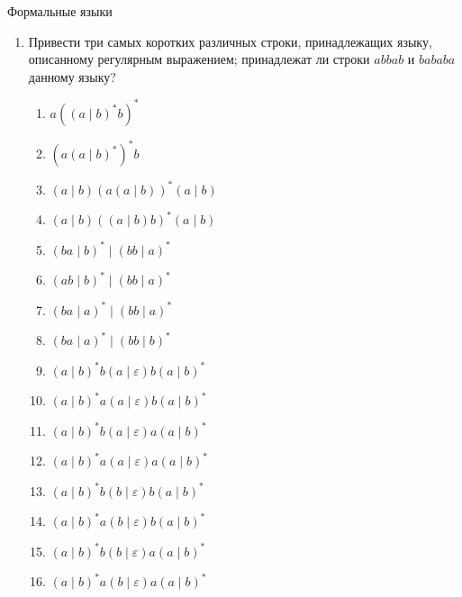\documentclass[12pt]{article}
\begin{document}
\begin{center}
{\LARGE Формальные языки}
\end{center}

\bigskip

\begin{enumerate}
\setlength\itemsep{1em}

  \item Привести три самых коротких различных строки, принадлежащих языку, описанному регулярным выражением; принадлежат ли строки $abbab$ и $bababa$ данному языку?
  \begin{enumerate}[label=\arabic*)]
    \setlength\itemsep{0.8em}
    \item $a ((a \mid b)^* b)^* $
    \item $(a (a \mid b)^*)^* b $
    \item $(a \mid b) (a (a \mid b))^* (a \mid b) $
    \item $(a \mid b) ((a \mid b) b)^* (a \mid b) $
    \item $(ba \mid b)^* \mid (bb \mid a)^*$
    \item $(ab \mid b)^* \mid (bb \mid a)^*$
    \item $(ba \mid a)^* \mid (bb \mid a)^*$
    \item $(ba \mid a)^* \mid (bb \mid b)^*$
    \item $(a \mid b)^* b (a \mid \varepsilon) b (a \mid b)^*$
    \item $(a \mid b)^* a (a \mid \varepsilon) b (a \mid b)^*$
    \item $(a \mid b)^* b (a \mid \varepsilon) a (a \mid b)^*$
    \item $(a \mid b)^* a (a \mid \varepsilon) a (a \mid b)^*$
    \item $(a \mid b)^* b (b \mid \varepsilon) b (a \mid b)^*$
    \item $(a \mid b)^* a (b \mid \varepsilon) b (a \mid b)^*$
    \item $(a \mid b)^* b (b \mid \varepsilon) a (a \mid b)^*$
    \item $(a \mid b)^* a (b \mid \varepsilon) a (a \mid b)^*$
  \end{enumerate}


\end{enumerate}
\end{document}
